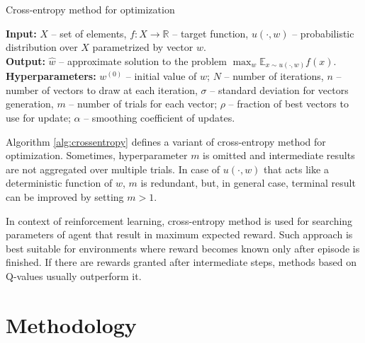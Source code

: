 \documentclass{article}
\begin{document}
\begin{algorithm}
	\caption{Cross-entropy method for optimization} \label{alg:crossentropy}
	\textbf{Input:} $X$ -- set of elements, $f: X \to \mathbb{R}$ -- target function, $u(\cdot, w)$ -- probabilistic distribution over $X$ parametrized by vector $w$. \\
	\textbf{Output:} $\hat{w}$ -- approximate solution to the problem $\max_w \mathbb{E}_{x \sim u(\cdot, w)} f(x)$. \\
	\textbf{Hyperparameters:} $w^{(0)}$ -- initial value of $w$; $N$ -- number of iterations, $n$ -- number of vectors to draw at each iteration, $\sigma$ -- standard deviation for vectors generation, $m$ -- number of trials for each vector; $\rho$ -- fraction of best vectors to use for update; $\alpha$ -- smoothing coefficient of updates.
	\begin{algorithmic}[1]
		    \ENDFOR
		\ENDFOR
	\end{algorithmic}
\end{algorithm}

Algorithm \ref{alg:crossentropy} defines a variant of cross-entropy method for optimization. Sometimes, hyperparameter $m$ is omitted and intermediate results are not aggregated over multiple trials. In case of $u(\cdot, w)$ that acts like a deterministic function of $w$, $m$ is redundant, but, in general case, terminal result can be improved by setting $m > 1$.

In context of reinforcement learning, cross-entropy method is used for searching parameters of agent that result in maximum expected reward. Such approach is best suitable for environments where reward becomes known only after episode is finished. If there are rewards granted after intermediate steps, methods based on Q-values usually outperform it.


\section{Methodology}
\label{sec:methodology}
\end{document}
